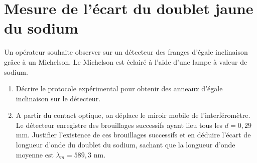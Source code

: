 \documentclass{article}
\begin{document}
\section{Mesure de l'écart du doublet jaune du sodium}


Un opérateur souhaite observer sur un détecteur des franges d'égale inclinaison grâce à un Michelson. 
Le Michelson est éclairé à l'aide d'une lampe à valeur de sodium. 
\begin{enumerate}
  \item Décrire le protocole expérimental pour obtenir des anneaux d'égale inclinaison sur le détecteur. 
  \item A partir du contact optique, on déplace le miroir mobile de l'interféromètre. Le détecteur enregistre des brouillages successifs ayant lieu tous les $d=0,29$mm. Justifier l'existence de ces brouillages successifs et en déduire l'écart de longueur d'onde du doublet du sodium, sachant que la longueur d'onde moyenne est $\lambda_m = 589,3$ nm. 
\end{enumerate}
\end{document}

